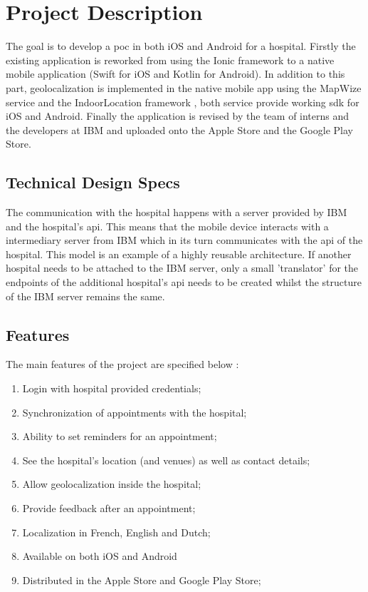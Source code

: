 \section{Project Description}
The goal is to develop a \acrfull{poc} in both iOS and Android for a hospital. Firstly the existing application is reworked from using the Ionic framework to a native mobile application (Swift for iOS and Kotlin for Android). In addition to this part, geolocalization is implemented in the native mobile app using the MapWize service \cite{MapWize.io2019} and the IndoorLocation framework \cite{IndoorLocation.io2019}, both service provide working \acrfull{sdk} for iOS and Android. Finally the application is revised by the team of interns and the developers at IBM and uploaded onto the Apple Store and the Google Play Store.
\subsection{Technical Design Specs}
The communication with the hospital happens with a server provided by IBM and the hospital's \acrfull{api}. This means that the mobile device interacts with a intermediary server from IBM which in its turn communicates with the \acrshort{api} of the hospital. This model is an example of a highly reusable architecture. If another hospital needs to be attached to the IBM server, only a small 'translator' for the endpoints of the additional hospital's \acrshort{api} needs to be created whilst the structure of the IBM server remains the same.
\subsection{Features}
The main features of the project are specified below \cite{medappspec}:
\begin{enumerate}
\item Login with hospital provided credentials;
\item Synchronization of appointments with the hospital;
\item Ability to set reminders for an appointment;
\item See the hospital's location (and venues) as well as contact details;
\item Allow geolocalization inside the hospital;
\item Provide feedback after an appointment;
\item Localization in French, English and Dutch;
\item Available on both iOS and Android
\item Distributed in the Apple Store and Google Play Store;
\end{enumerate}
